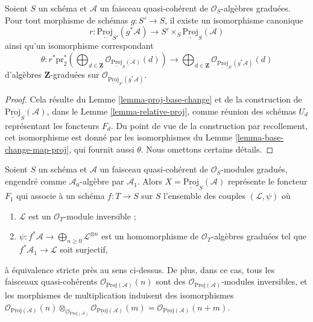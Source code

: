 \begin{lemma}
\label{lemma-relative-proj-base-change}
Soient $S$ un schéma et $\mathcal{A}$ un faisceau quasi-cohérent de
$\mathcal{O}_S$-algèbres graduées. Pour tout morphisme de schémas
$g : S' \to S$, il existe un isomorphisme canonique
$$
r :
\underline{\text{Proj}}_{S'}(g^*\mathcal{A})
\longrightarrow
S' \times_S \underline{\text{Proj}}_S(\mathcal{A})
$$
ainsi qu'un isomorphisme correspondant
$$
\theta :
r^*\text{pr}_2^*\left(\bigoplus\nolimits_{d \in \mathbf{Z}}
\mathcal{O}_{\underline{\text{Proj}}_S(\mathcal{A})}(d)\right)
\longrightarrow
\bigoplus\nolimits_{d \in \mathbf{Z}}
\mathcal{O}_{\underline{\text{Proj}}_{S'}(g^*\mathcal{A})}(d)
$$
d'algèbres $\mathbf{Z}$-graduées sur
$\mathcal{O}_{\underline{\text{Proj}}_{S'}(g^*\mathcal{A})}$.
\end{lemma}

\begin{proof}
Cela résulte du Lemme \ref{lemma-proj-base-change} et de la construction
de $\underline{\text{Proj}}_S(\mathcal{A})$, dans le
Lemme \ref{lemma-relative-proj}, comme
réunion des schémas $U_d$ représentant
les foncteurs $F_d$. Du point de vue de la construction par recollement,
cet isomorphisme est donné par les isomorphismes du
Lemme \ref{lemma-base-change-map-proj}, qui fournit aussi $\theta$.
Nous omettons certains détails.
\end{proof}

\begin{lemma}
\label{lemma-apply-relative}
Soient $S$ un schéma et $\mathcal{A}$ un faisceau quasi-cohérent de
$\mathcal{O}_S$-modules gradués, engendré comme $\mathcal{A}_0$-algèbre par
$\mathcal{A}_1$. Alors $X = \underline{\text{Proj}}_S(\mathcal{A})$
représente le foncteur $F_1$ qui associe à un schéma $f : T \to S$ sur $S$
l'ensemble des couples $(\mathcal{L}, \psi)$ où
\begin{enumerate}
\item $\mathcal{L}$ est un $\mathcal{O}_T$-module inversible ;
\item
$\psi : f^*\mathcal{A} \to \bigoplus_{n \geq 0} \mathcal{L}^{\otimes n}$
est un homomorphisme de $\mathcal{O}_T$-algèbres graduées tel que
$f^*\mathcal{A}_1 \to \mathcal{L}$ soit surjectif,
\end{enumerate}
à équivalence stricte près au sens
ci-dessus. De plus, dans ce cas, tous les
faisceaux quasi-cohérents
$\mathcal{O}_{\underline{\text{Proj}}(\mathcal{A})}(n)$ sont des
$\mathcal{O}_{\underline{\text{Proj}}(\mathcal{A})}$-modules inversibles,
et les morphismes de multiplication induisent des isomorphismes
$
\mathcal{O}_{\underline{\text{Proj}}(\mathcal{A})}(n)
\otimes_{\mathcal{O}_{\underline{\text{Proj}}(\mathcal{A})}}
\mathcal{O}_{\underline{\text{Proj}}(\mathcal{A})}(m) =
\mathcal{O}_{\underline{\text{Proj}}(\mathcal{A})}(n + m)$.
\end{lemma}

